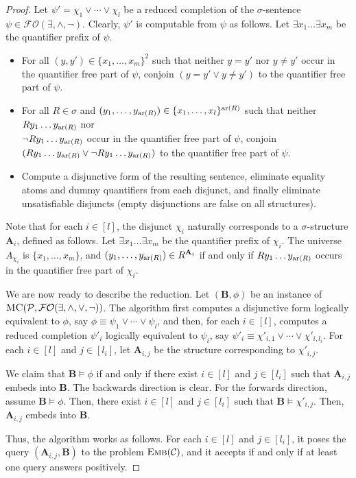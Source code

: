 \documentclass[usletter]{article}
\newcommand{\longversion}[1]{#1}
\begin{document}
{\begin{proof}
Let $\psi'=\chi_1 \vee \cdots \vee \chi_l$ be a reduced completion of 
the $\sigma$-sentence $\psi \in \mathcal{FO}(\exists,\wedge,\neg)$.  
Clearly, $\psi'$ is computable from $\psi$ as follows.  
Let $\exists x_1 \ldots \exists x_{m}$ 
be the quantifier prefix of $\psi$.  
\begin{itemize}
\item For all $(y,y') \in \{x_1,\ldots,x_m\}^2$ such that neither $y=y'$ nor $y \neq y'$ occur in the quantifier free part of $\psi$, 
conjoin $(y=y' \vee y \neq y')$ to the quantifier free part of $\psi$.
\item For all $R \in \sigma$ and $(y_1,\ldots,y_{\textup{ar}(R)}) \in \{x_1,\ldots,x_l\}^{\textup{ar}(R)}$ 
such that neither $R y_1 \ldots y_{\textup{ar}(R)}$ nor\longversion{\\} $\neg R y_1 \ldots y_{\textup{ar}(R)}$ occur in the quantifier free part of $\psi$, 
conjoin $(R y_1 \ldots y_{\textup{ar}(R)} \vee \neg R y_1 \ldots y_{\textup{ar}(R)})$ to the quantifier free part of $\psi$.
\item Compute a disjunctive form of the resulting sentence, eliminate equality atoms and dummy quantifiers from each disjunct, 
and finally eliminate unsatisfiable disjuncts (empty disjunctions are false on all structures).
\end{itemize}

Note that for each $i \in [l]$, the disjunct $\chi_i$ naturally corresponds to 
a $\sigma$-structure $\mathbf{A}_i$, defined as follows.  
Let $\exists x_1 \ldots \exists x_{m}$ be the quantifier prefix of $\chi_i$.  
The universe $A_{\chi_i}$ is $\{x_1,\ldots,x_{m}\}$, 
and $(y_1,\ldots,y_{\textup{ar}(R)}) \in R^{\mathbf{A}_i}$ 
if and only if $R y_1 \ldots y_{\textup{ar}(R)}$ occurs in the quantifier free part of $\chi_i$.

We are now ready to describe the reduction.  Let $(\mathbf{B},\phi)$ be an instance of 
$\textsc{MC}(\mathcal{P},\mathcal{FO}(\exists,\wedge,\vee,\neg))$.  
The algorithm first computes a disjunctive form logically equivalent to $\phi$, 
say $\phi \equiv \psi_1 \vee \cdots \vee \psi_l$, and then, for each $i \in [l]$, 
computes a reduced completion $\psi'_i$ logically equivalent to $\psi_i$, 
say $\psi'_i \equiv \chi'_{i,1} \vee \cdots \vee \chi'_{i,l_i}$.  
For each $i \in [l]$ and $j \in [l_i]$, 
let $\mathbf{A}_{i,j}$ be the structure corresponding to $\chi'_{i,j}$.  

We claim that $\mathbf{B} \models \phi$ if and only if 
there exist $i \in [l]$ and $j \in [l_i]$ such that $\mathbf{A}_{i,j}$ embeds into $\mathbf{B}$.  
The backwards direction is clear.  For the forwards direction, 
assume $\mathbf{B} \models \phi$.  Then, there exist $i \in [l]$ and $j \in [l_i]$ 
such that $\mathbf{B} \models \chi'_{i,j}$.  Then, $\mathbf{A}_{i,j}$ embeds 
into $\mathbf{B}$.


Thus, the algorithm works as follows.  For each $i \in [l]$ and $j \in [l_i]$, 
it poses the query $(\mathbf{A}_{i,j},\mathbf{B})$ to the problem $\textsc{Emb}(\mathcal{C})$, 
and it accepts if and only if at least one query answers positively.
\end{proof}
}
\longversion{\pfmetodological}
\end{document}
